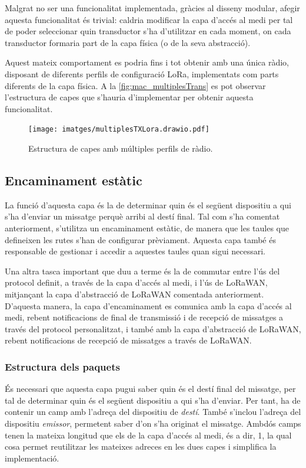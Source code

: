 \documentclass{tfgitic}[2024/07/01]
\begin{document}
{Malgrat no ser una funcionalitat implementada, gràcies al disseny modular, afegir aquesta funcionalitat és trivial: caldria modificar la capa d'accés al medi per tal de poder seleccionar quin transductor s'ha d'utilitzar en cada moment, on cada transductor formaria part de la capa física (o de la seva abstracció).

Aquest mateix comportament es podria fins i tot obtenir amb una única ràdio, disposant de diferents perfils de configuració LoRa, implementats com parts diferents de la capa física. A la \autoref{fig:mac_multiplesTrans} es pot observar l'estructura de capes que s'hauria d'implementar per obtenir aquesta funcionalitat.

\begin{figure}
    \centering
        \texttt{[image: imatges/multiplesTXLora.drawio.pdf]}
    \caption{Estructura de capes amb múltiples perfils de ràdio.}
    \label{fig:mac_multiplesTrans}
\end{figure}


\subsection{Encaminament estàtic}
La funció d'aquesta capa és la de determinar quin és el següent dispositiu a qui s'ha d'enviar un missatge perquè arribi al destí final. Tal com s'ha comentat anteriorment, s'utilitza un encaminament estàtic, de manera que les taules que defineixen les rutes s'han de configurar prèviament. Aquesta capa també és responsable de gestionar i accedir a aquestes taules quan sigui necessari.

Una altra tasca important que duu a terme és la de commutar entre l'ús del protocol definit, a través de la capa d'accés al medi, i l'ús de LoRaWAN, mitjançant la capa d'abstracció de LoRaWAN comentada anteriorment. D'aquesta manera, la capa d'encaminament es comunica amb la capa d'accés al medi, rebent notificacions de final de transmissió i de recepció de missatges a través del protocol personalitzat, i també amb la capa d'abstracció de LoRaWAN, rebent notificacions de recepció de missatges a través de LoRaWAN.

\subsubsection{Estructura dels paquets}
És necessari que aquesta capa pugui saber quin és el destí final del missatge, per tal de determinar quin és el següent dispositiu a qui s'ha d'enviar. Per tant, ha de contenir un camp amb l'adreça del dispositiu de \emph{destí}. També s'inclou l'adreça del dispositiu \emph{emissor}, permetent saber d'on s'ha originat el missatge. Ambdós camps tenen la mateixa longitud que els de la capa d'accés al medi, és a dir, \SI{1}{\byte}, la qual cosa permet reutilitzar les mateixes adreces en les dues capes i simplifica la implementació.

}
\end{document}
